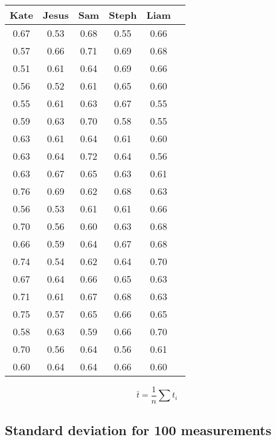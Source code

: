 \documentclass[11pt, letterpaper, includehead]{article}
\begin{document}
  \begin{center} 
    \begin{tabular}{|  c | c | c | c | c | c | } 
      \hline
        \textbf{Kate} & \textbf{Jesus} &\textbf{Sam} & \textbf{Steph} & \textbf{Liam}\\ 
        \hline\hline
        0.67 & 0.53 & 0.68 & 0.55 & 0.66 \\ 
        \hline
        0.57 & 0.66 & 0.71 & 0.69 & 0.68 \\ 
        \hline
        0.51 & 0.61 & 0.64 & 0.69 & 0.66 \\ 
        \hline
        0.56 & 0.52 & 0.61 & 0.65 & 0.60 \\ 
        \hline
        0.55 & 0.61 & 0.63 & 0.67 & 0.55 \\ 
        \hline
        0.59 & 0.63 & 0.70 & 0.58 & 0.55 \\ 
        \hline
        0.63 & 0.61 & 0.64 & 0.61 & 0.60 \\ 
        \hline
        0.63 & 0.64 & 0.72 & 0.64 & 0.56 \\ 
        \hline
        0.63 & 0.67 & 0.65 & 0.63 & 0.61 \\ 
        \hline
        0.76 & 0.69 & 0.62 & 0.68 & 0.63 \\ 
        \hline
        0.56 & 0.53 & 0.61 & 0.61 & 0.66 \\ 
        \hline
        0.70 & 0.56 & 0.60 & 0.63 & 0.68 \\ 
        \hline
        0.66 & 0.59 & 0.64 & 0.67 & 0.68 \\ 
        \hline
        0.74 & 0.54 & 0.62 & 0.64 & 0.70 \\ 
        \hline
        0.67 & 0.64 & 0.66 & 0.65 & 0.63 \\ 
        \hline
        0.71 & 0.61 & 0.67 & 0.68 & 0.63 \\ 
        \hline
        0.75 & 0.57 & 0.65 & 0.66 & 0.65 \\ 
        \hline
        0.58 & 0.63 & 0.59 & 0.66 & 0.70 \\ 
        \hline
        0.70 & 0.56 & 0.64 & 0.56 & 0.61 \\ 
        \hline
        0.60 & 0.64 & 0.64 & 0.66 & 0.60 \\ 
        \hline
      \end{tabular} 
  \end{center}


  $$\bar{t} = \frac{1}{n}\sum t_i$$

  \subsection{Standard deviation for 100 measurements} %
\end{document}
